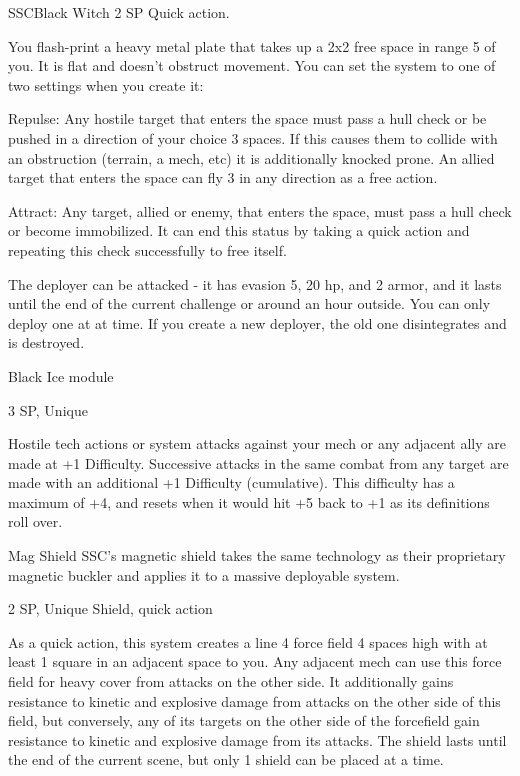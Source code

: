 \begin{mech}{SSC}{Black Witch}
2 SP
Quick action.

You flash-print a heavy metal plate that takes up a 2x2 free space in range 5 of you. It is flat and doesn't obstruct movement. You can set the system to one of two settings when you create it:

         Repulse: Any hostile target that enters the space must pass a hull check or be pushed in a direction of your choice 3 spaces. If this causes them to collide with an obstruction (terrain, a mech, etc) it is additionally knocked prone. An allied target that enters the space can fly 3 in any direction as a free action.

         Attract: Any target, allied or enemy, that enters the space, must pass a hull check or become immobilized. It can end this status by taking a quick action and repeating this check successfully to free itself.

The deployer can be attacked - it has evasion 5, 20 hp, and 2 armor, and it lasts until the end of the current challenge or around an hour outside. You can only deploy one at at time. If you create a new deployer, the old one disintegrates and is destroyed.


Black Ice module

3 SP, Unique

Hostile tech actions or system attacks against your mech or any adjacent ally are made at +1 Difficulty. Successive attacks in the same combat from any target are made with an additional +1 Difficulty (cumulative). This difficulty has a maximum of +4, and resets when it would hit +5 back to +1 as its definitions roll over.


Mag Shield
SSC's magnetic shield takes the same technology as their proprietary magnetic buckler and applies it to a massive deployable system.

2 SP, Unique
Shield, quick action

As a quick action, this system creates a line 4 force field 4 spaces high with at least 1 square in an adjacent space to you. Any adjacent mech can use this force field for heavy cover from attacks on the other side. It additionally gains resistance to kinetic and explosive damage from attacks on the other side of this field, but conversely, any of its targets on the other side of the forcefield gain resistance to kinetic and explosive damage from its attacks. The shield lasts until the end of the current scene, but only 1 shield can be placed at a time.
\end{mech}
